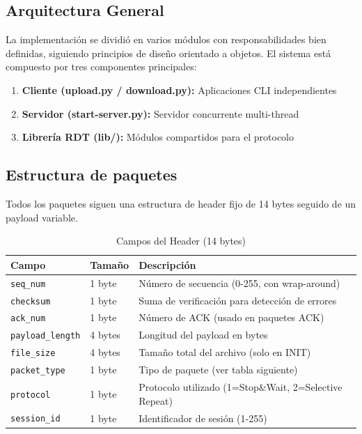 \subsection{Arquitectura General}
La implementación se dividió en varios módulos con responsabilidades bien definidas, siguiendo principios de diseño orientado a objetos.
El sistema está compuesto por tres componentes principales:

\begin{enumerate}
    \item \textbf{Cliente (upload.py / download.py):} Aplicaciones CLI independientes
    \item \textbf{Servidor (start-server.py):} Servidor concurrente multi-thread
    \item \textbf{Librería RDT (lib/):} Módulos compartidos para el protocolo
\end{enumerate}

\subsection{Estructura de paquetes}
Todos los paquetes siguen una estructura de header fijo de 14 bytes seguido de un payload variable.

\begin{table}[H]
\centering
\begin{tabular}{@{}lll@{}}
\toprule
\textbf{Campo}        & \textbf{Tamaño} & \textbf{Descripción} \\ \midrule
\texttt{seq\_num}     & 1 byte  & Número de secuencia (0-255, con wrap-around) \\
\texttt{checksum}     & 1 byte  & Suma de verificación para detección de errores \\
\texttt{ack\_num}     & 1 byte  & Número de ACK (usado en paquetes ACK) \\
\texttt{payload\_length} & 4 bytes & Longitud del payload en bytes \\
\texttt{file\_size}   & 4 bytes & Tamaño total del archivo (solo en INIT) \\
\texttt{packet\_type} & 1 byte  & Tipo de paquete (ver tabla siguiente) \\
\texttt{protocol}     & 1 byte  & Protocolo utilizado (1=Stop\&Wait, 2=Selective Repeat) \\
\texttt{session\_id}  & 1 byte  & Identificador de sesión (1-255) \\ \bottomrule
\end{tabular}
\caption{Campos del Header (14 bytes)}
\end{table}

